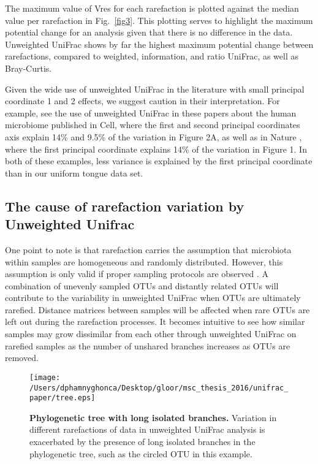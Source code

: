 \documentclass[10pt,letterpaper]{article}
\begin{document}
The maximum value of Vres for each rarefaction is plotted against the median value per rarefaction in Fig.~\ref{fig3}. This plotting serves to highlight the maximum potential change for an analysis given that there is no difference in the data. Unweighted UniFrac shows by far the highest maximum potential change between rarefactions, compared to weighted, information, and ratio UniFrac, as well as Bray-Curtis.

Given the wide use of unweighted UniFrac in the literature with small principal coordinate 1 and 2 effects, we suggest caution in their interpretation. For example, see the use of unweighted UniFrac in these papers about the human microbiome published in Cell\cite{hsiao2013microbiota}, where the first and second principal coordinates axis explain 14\% and 9.5\% of the variation in Figure 2A, as well as in Nature \cite{sonnenburg2016diet}, where the first principal coordinate explains 14\% of the variation in Figure 1. In both of these examples, less variance is explained by the first principal coordinate than in our uniform tongue data set.

\FloatBarrier

\subsection{The cause of rarefaction variation by Unweighted Unifrac}
One point to note is that rarefaction carries the assumption that microbiota within samples are homogeneous and randomly distributed. However, this assumption is only valid if proper sampling protocols are observed \cite{gorzelak2015methods}. A combination of unevenly sampled OTUs and distantly related OTUs will contribute to the variability in unweighted UniFrac when OTUs are ultimately rarefied. Distance matrices between samples will be affected when rare OTUs are left out during the rarefaction processes. It becomes intuitive to see how similar samples may grow dissimilar from each other through unweighted UniFrac on rarefied samples as the number of unshared branches increases as OTUs are removed.

\begin{figure}[h]
\texttt{[image: /Users/dphamnyghonca/Desktop/gloor/msc\_thesis\_2016/unifrac\_paper/tree.eps]}
\caption[Phylogenetic tree with long isolated branches.]{{\bf Phylogenetic tree with long isolated branches.}
Variation in different rarefactions of data in unweighted UniFrac analysis is exacerbated by the presence of long isolated branches in the phylogenetic tree, such as the circled OTU in this example.}
\label{fig4}
\end{figure}
\end{document}
